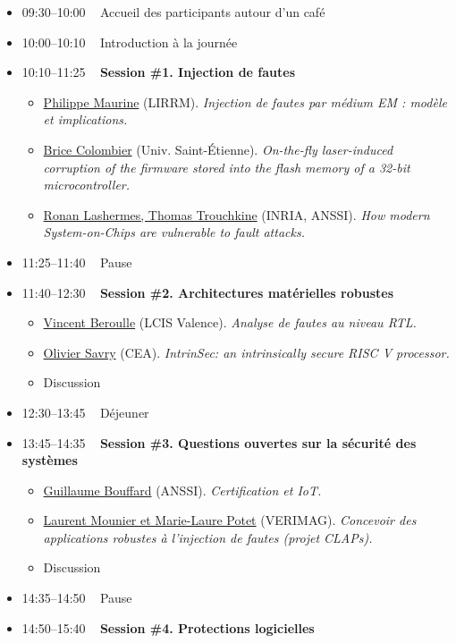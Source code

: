 \documentclass[a4paper,11pt]{article}
\begin{document}
\begin{itemize}
\item 09:30--10:00   Accueil des participants autour d’un café
\item 10:00--10:10   Introduction à la journée
\item 10:10--11:25   \textbf{Session \#1. Injection de fautes}
\begin{itemize}
\item \hyperref[sec:org0856570]{Philippe Maurine} (LIRRM). \emph{Injection de fautes par médium EM : modèle et implications.}
\item \hyperref[sec:orgcc68781]{Brice Colombier} (Univ. Saint-Étienne). \emph{On-the-fly laser-induced corruption of the firmware stored into the flash memory of a 32-bit microcontroller.}
\item \hyperref[sec:org63182f3]{Ronan Lashermes, Thomas Trouchkine} (INRIA, ANSSI). \emph{How modern System-on-Chips are vulnerable to fault attacks.}
\end{itemize}
\item 11:25--11:40   Pause
\item 11:40--12:30   \textbf{Session \#2. Architectures matérielles robustes}
\begin{itemize}
\item \hyperref[sec:orge46cf20]{Vincent Beroulle} (LCIS Valence). \emph{Analyse de fautes au niveau RTL.}
\item \hyperref[sec:org45d4d84]{Olivier Savry} (CEA). \emph{IntrinSec: an intrinsically secure RISC V processor.}
\item Discussion
\end{itemize}
\item 12:30--13:45   Déjeuner
\item 13:45--14:35   \textbf{Session \#3. Questions ouvertes sur la sécurité des systèmes}
\begin{itemize}
\item \hyperref[sec:orgb170639]{Guillaume Bouffard} (ANSSI). \emph{Certification et IoT.}
\item \hyperref[sec:orgcbe0334]{Laurent Mounier et Marie-Laure Potet} (VERIMAG). \emph{Concevoir des applications robustes à l’injection de fautes (projet CLAPs).}
\item Discussion
\end{itemize}
\item 14:35--14:50   Pause
\item 14:50--15:40   \textbf{Session \#4. Protections logicielles}
\begin{itemize}

\end{itemize}
\end{itemize}
\end{document}

